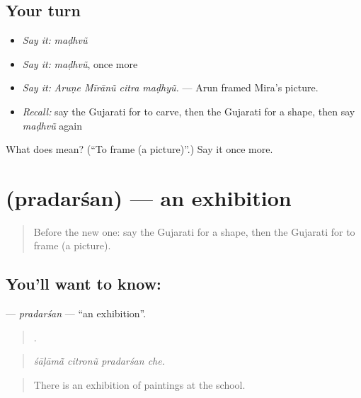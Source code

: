 \subsection*{Your turn}
\begin{itemize}
\raggedright
  \item \emph{Say it:} \emph{maḍhvũ}
  \item \emph{Say it:} \emph{maḍhvũ}, once more
  \item \emph{Say it:} \emph{Aruṇe Mīrānũ citra maḍhyũ.} — Arun framed Mira's picture.
  \item \emph{Recall:} say the Gujarati for to carve, then the Gujarati for a shape, then say \emph{maḍhvũ} again
\end{itemize}

\begin{tcolorbox}[breakable,colback=teal!4,colframe=teal!35!black,title={Before you move on}]
What does  mean? (\textquotedblleft{}To frame (a picture)\textquotedblright{}.) Say it once more.
\end{tcolorbox}
\section[\texorpdfstring{\gu{પ્રદર્શન} (pradarśan)}{પ્રદર્શન (pradarśan)}]{ (pradarśan) — an exhibition}

\label{lesson:GU-C525-pradarsan}



\begin{quote}
Before the new one: say the Gujarati for a shape, then the Gujarati for to frame (a picture).
\end{quote}

\subsection*{You'll want to know: }
\textbf{} — \emph{pradarśan} — \textquotedblleft{}an exhibition\textquotedblright{}.

\begin{quote}
   .
\end{quote}

\begin{quote}
\emph{śāḷāmā̃ citronũ pradarśan che.}
\end{quote}

\begin{quote}
There is an exhibition of paintings at the school.
\end{quote}

